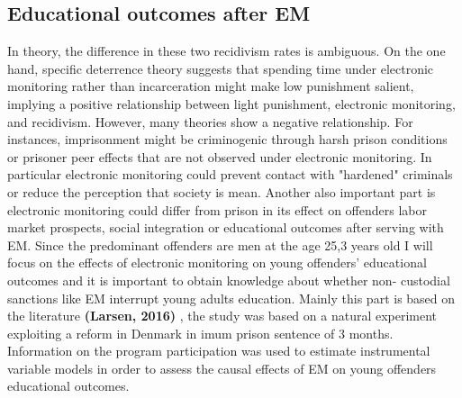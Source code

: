 \documentclass[a4paper,12pt]{article}
\begin{document}
\subsection{Educational outcomes after EM}
In theory, the difference in these two recidivism rates is ambiguous. On the one hand, specific deterrence theory suggests that spending time under electronic monitoring rather than incarceration might make low punishment salient, implying a positive relationship between light punishment, electronic monitoring, and recidivism. However, many theories show a negative relationship. For instances, imprisonment might be criminogenic through harsh prison conditions or prisoner peer effects that are not observed under electronic monitoring. In particular electronic monitoring could prevent contact with "hardened" criminals or reduce the perception that society is mean. Another also important part is electronic monitoring could differ from prison in its effect on offenders labor market prospects, social integration or educational outcomes after serving with EM. Since the predominant offenders are men at the age 25,3 years old I will focus on the effects of electronic monitoring on young offenders' educational outcomes and it is important to obtain knowledge about whether non- custodial sanctions like EM interrupt young adults education. Mainly this part is based on the literature \textbf{(Larsen, 2016)} \cite{Larsen2017}, the study was based on a natural experiment exploiting a reform in Denmark in imum prison sentence of 3 months. Information on the program participation was used to estimate instrumental variable models in order to assess the causal effects of EM on young offenders educational outcomes. 
\end{document}
